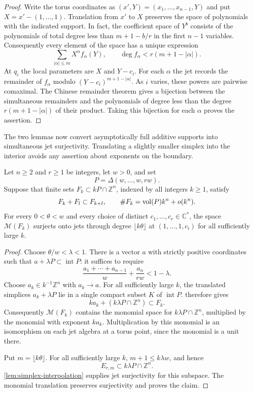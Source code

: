 \begin{proof}
Write the torus coordinates as $(x',Y)=(x_1,\ldots,x_{n-1},Y)$ and put $X=x'-(1,\ldots,1)$. Translation from $x'$ to $X$ preserves the space of polynomials with the indicated support. In fact, the coefficient space of $Y^b$ consists of the polynomials of total degree less than $m+1-b/r$ in the first $n-1$ variables. Consequently every element of the space has a unique expression
\[
 \sum_{|\alpha|\le m}X^\alpha f_\alpha(Y),
 \qquad
 \deg f_\alpha<r(m+1-|\alpha|).
\]
At $q_i$ the local parameters are $X$ and $Y-c_i$. For each $\alpha$ the jet records the remainder of $f_\alpha$ modulo $(Y-c_i)^{m+1-|\alpha|}$. As $i$ varies, these powers are pairwise comaximal. The Chinese remainder theorem gives a bijection between the simultaneous remainders and the polynomials of degree less than the degree $r(m+1-|\alpha|)$ of their product. Taking this bijection for each $\alpha$ proves the assertion.
\end{proof}

The two lemmas now convert asymptotically full additive supports into simultaneous jet surjectivity. Translating a slightly smaller simplex into the interior avoids any assertion about exponents on the boundary.

\begin{proposition}
\label{prop:asymptotic-jets}
Let $n\ge2$ and $r\ge1$ be integers, let $w>0$, and set
\[
 P=\Delta(w,\ldots,w,rw).
\]
Suppose that finite sets $F_k\subset kP\cap\mathbb{Z}^n$, indexed by all integers $k\ge1$, satisfy
\[
 F_k+F_l\subset F_{k+l},
 \qquad
 \#F_k=\operatorname{vol}(P)k^n+o(k^n).
\]
For every $0<\theta<w$ and every choice of distinct $c_1,\ldots,c_r\in\mathbb{C}^*$, the space $\mathcal{M}(F_k)$ surjects onto jets through degree $\lfloor k\theta\rfloor$ at $(1,\ldots,1,c_i)$ for all sufficiently large $k$.
\end{proposition}

\begin{proof}
Choose $\theta/w<\lambda<1$. There is a vector $a$ with strictly positive coordinates such that $a+\lambda P\subset\operatorname{int}P$: it suffices to require
\[
 \frac{a_1+\cdots+a_{n-1}}w+\frac{a_n}{rw}<1-\lambda.
\]
Choose $a_k\in k^{-1}\mathbb{Z}^n$ with $a_k\to a$. For all sufficiently large $k$, the translated simplices $a_k+\lambda P$ lie in a single compact subset $K$ of $\operatorname{int}P$.  therefore gives
\[
 ka_k+(k\lambda P\cap\mathbb{Z}^n)\subset F_k.
\]
Consequently $\mathcal{M}(F_k)$ contains the monomial space for $k\lambda P\cap\mathbb{Z}^n$, multiplied by the monomial with exponent $ka_k$. Multiplication by this monomial is an isomorphism on each jet algebra at a torus point, since the monomial is a unit there.

Put $m=\lfloor k\theta\rfloor$. For all sufficiently large $k$, $m+1\le k\lambda w$, and hence
\[
 E_{r,m}\subset k\lambda P\cap\mathbb{Z}^n.
\]
\cref{lem:simplex-interpolation} supplies jet surjectivity for this subspace. The monomial translation preserves surjectivity and proves the claim.
\end{proof}
